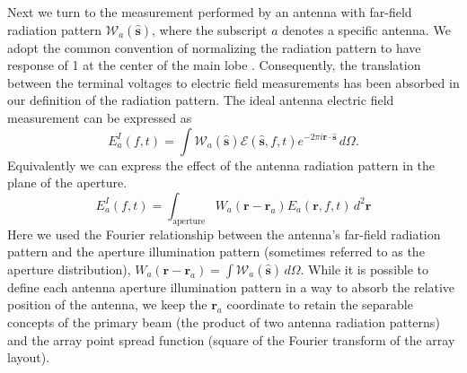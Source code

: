 \documentclass[a4paper,fleqn,usenatbib]{mnras}
\newcommand{\ra}{\ensuremath{\mathbf{r}_a}}
\newcommand{\beamr}{\ensuremath{\widetilde{W}}}
\newcommand{\Er}[1]{\ensuremath{\widetilde{E}_{#1}}}
\newcommand{\dif}{\mathrm{d}}
\begin{document}
Next we turn to the measurement performed by an antenna with far-field radiation pattern 
$\mathcal{W}_a(\hat{\mathbf{s}})$, where the subscript $a$ denotes a specific antenna. We 
adopt the common convention of normalizing the radiation pattern to have response of 1 at the 
center of the main lobe \citep[e.g.][]{nap99}. Consequently, the translation between the terminal 
voltages to electric field measurements has been absorbed in our definition of the radiation 
pattern. The ideal antenna electric field measurement can be expressed as 
\begin{equation}
E^I_a(f,t) = \int \mathcal{W}_a(\hat{\mathbf{s}})\mathcal{E}(\hat{\mathbf{s}},f,t) e^{-2\pi i \mathbf{r} \cdot \hat{\mathbf{s}}}\, d\Omega. 
\end{equation}
Equivalently we can express the effect of the antenna radiation pattern in the plane of the 
aperture.
\begin{equation}
E^I_a(f,t) = \int_{\mathrm{aperture}}W_a(\mathbf{r}-\mathbf{r}_a)E_a(\mathbf{r},f,t)\,d^2\mathbf{r}
\end{equation}
Here we used the Fourier relationship between the antenna's far-field radiation pattern and the 
aperture illumination pattern (sometimes referred to as the aperture distribution), $W_a(\mathbf{r}-\mathbf{r}_a)=\int  \mathcal{W}_a(\hat{\mathbf{s}}) \, d
\Omega$. 
While it is possible to define each antenna aperture illumination pattern in a way to absorb the 
relative position of the antenna, we keep the $\mathbf{r}_a$ coordinate to retain the separable
concepts of the primary beam (the product of two antenna radiation patterns) and the array
point spread function (square of the Fourier transform of the array layout).

\end{document}

